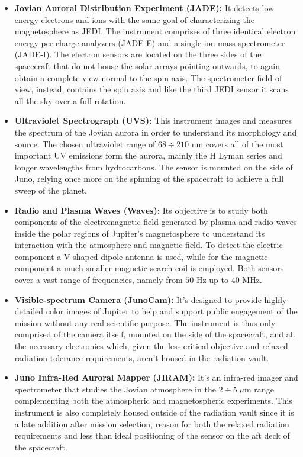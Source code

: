 \begin{itemize}
    \item \textbf{Jovian Auroral Distribution Experiment (JADE):} It detects low energy electrons and ions with the same goal of characterizing the magnetosphere as JEDI. The instrument comprises of three identical electron energy per charge analyzers (JADE-E) and a single ion mass spectrometer (JADE-I). The electron sensors are located on the three sides of the  spacecraft that do not house the solar arrays pointing outwards, to again obtain a complete view normal to the spin axis. The spectrometer field of view, instead, contains the spin axis and like the third JEDI sensor it scans all the sky over a full rotation.
    
    \item \textbf{Ultraviolet Spectrograph (UVS):} This instrument images and measures the spectrum of the Jovian aurora in order to understand its morphology and source. The chosen ultraviolet range of $68 \div 210$ nm covers all of the most important UV emissions form the aurora, mainly the H Lyman series and longer wavelengths from hydrocarbons. The sensor is mounted on the side of Juno, relying once more on the spinning of the spacecraft to achieve a full sweep of the planet. 
    
    \item \textbf{Radio and Plasma Waves (Waves):} Its objective is to study both components of the electromagnetic field generated by plasma and radio waves inside the polar regions of Jupiter's magnetosphere to understand its interaction with the atmosphere and magnetic field. To detect the electric component a V-shaped dipole antenna is used, while for the magnetic component a much smaller magnetic search coil is employed. Both sensors cover a vast range of frequencies, namely from $50$ Hz up to $40$ MHz.

    \item \textbf{Visible-spectrum Camera (JunoCam):} It's designed to provide highly detailed color images of Jupiter to help and support public engagement of the mission without any real scientific purpose. The instrument is thus only comprised of the camera itself, mounted on the side of the spacecraft, and all the necessary electronics which, given the less critical objective and relaxed radiation tolerance requirements, aren't housed in the radiation vault.

    \item \textbf{Juno Infra-Red Auroral Mapper (JIRAM):} It's an infra-red imager and spectrometer that studies the Jovian atmosphere in the $2 \div 5 \; \mu$m range complementing both the atmospheric and magnetospheric experiments. This instrument is also completely housed outside of the radiation vault since it is a late addition after mission selection, reason for both the relaxed radiation requirements and less than ideal positioning of the sensor on the aft deck of the spacecraft.
       
\end{itemize}

